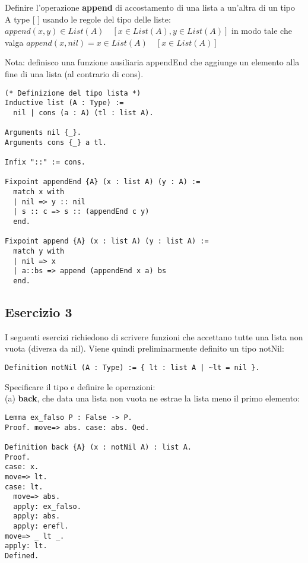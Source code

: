 Definire l'operazione \textbf{append} di accostamento di una lista a un'altra di un tipo A 
type [ ] usando le regole del tipo delle liste:
$append(x, y) \in List(A) \quad [x \in List(A), y \in List(A)]$
in modo tale che valga $append(x, nil) = x \in List(A) \quad [x \in List(A)]$

Nota: definisco una funzione ausiliaria appendEnd che aggiunge un elemento alla fine 
di una lista (al contrario di cons).

\begin{lstlisting}[language=Coq]
(* Definizione del tipo lista *)
Inductive list (A : Type) :=
  nil | cons (a : A) (tl : list A).

Arguments nil {_}.
Arguments cons {_} a tl.

Infix "::" := cons.

Fixpoint appendEnd {A} (x : list A) (y : A) :=
  match x with
  | nil => y :: nil
  | s :: c => s :: (appendEnd c y)
  end.

Fixpoint append {A} (x : list A) (y : list A) :=
  match y with
  | nil => x
  | a::bs => append (appendEnd x a) bs
  end.
\end{lstlisting}

\subsection{Esercizio 3}

I seguenti esercizi richiedono di scrivere funzioni che accettano tutte una 
lista non vuota (diversa da nil). Viene quindi preliminarmente definito un tipo 
notNil:

\begin{lstlisting}[language=Coq]
Definition notNil (A : Type) := { lt : list A | ~lt = nil }.
\end{lstlisting}

Specificare il tipo e definire le operazioni: \\

(a) \textbf{back}, che data una lista non vuota ne estrae la lista meno il primo elemento:

\begin{lstlisting}[language=Coq]
Lemma ex_falso P : False -> P.
Proof. move=> abs. case: abs. Qed.

Definition back {A} (x : notNil A) : list A.
Proof.
case: x.
move=> lt.
case: lt.
  move=> abs.
  apply: ex_falso.
  apply: abs.
  apply: erefl.
move=> _ lt _.
apply: lt.
Defined.
\end{lstlisting}


